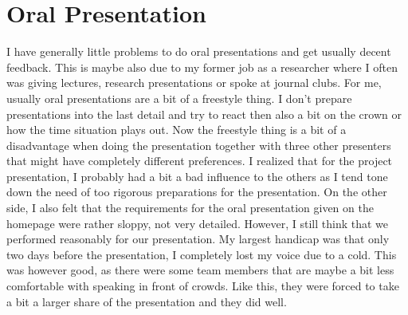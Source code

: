 \documentclass[a4paper,11pt,twoside]{article}
\begin{document}
\section{Oral Presentation}
I have generally little problems to do oral presentations and get usually decent feedback. This is maybe also due to my former job as a researcher where I often was giving lectures, research presentations or spoke at journal clubs. For me, usually oral presentations are a bit of a freestyle thing. I don't prepare presentations into the last detail and try to react then also a bit on the crown or how the time situation plays out. Now the freestyle thing is a bit of a disadvantage when doing the presentation together with three other presenters that might have completely different preferences. I realized that for the project presentation, I probably had a bit a bad influence to the others as I tend tone down the need of too rigorous preparations for the presentation. On the other side, I also felt that the requirements for the oral presentation given on the homepage were rather sloppy, not very detailed.
However, I still think that we performed reasonably for our presentation. My largest handicap was that only two days before the presentation, I completely lost my voice due to a cold. This was however good, as there were some team members that are maybe a bit less comfortable with speaking in front of crowds. Like this, they were forced to take a bit a larger share of the presentation and they did well.



\end{document}
